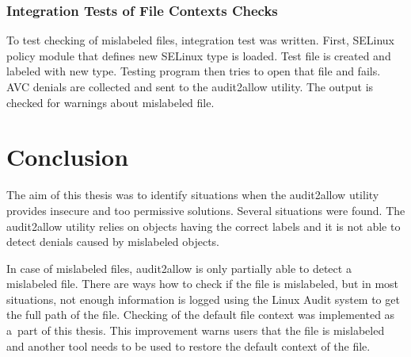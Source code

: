 \subsection{Integration Tests of File Contexts Checks}
To test checking of mislabeled files, integration test was written. First,
SELinux policy module that defines new SELinux type is loaded. Test file is
created and labeled with new type. Testing program then tries to open that
file and fails. AVC denials are collected and sent to the audit2allow utility.
The output is checked for warnings about mislabeled file.

\chapter{Conclusion}


The aim of this thesis was to identify situations when the audit2allow utility
provides insecure and too permissive solutions. Several situations were found.
The audit2allow utility relies on objects having the correct labels and it is
not able to detect denials caused by mislabeled objects.

In case of mislabeled files, audit2allow is only partially able to detect a
mislabeled file. There are ways how to check if the file is mislabeled, but in
most situations, not enough information is logged using the Linux Audit system
to get the full path of the file. Checking of the default file context was
implemented as a~part of this thesis. This improvement warns users that the file
is mislabeled and another tool needs to be used to restore the default context
of the file.

